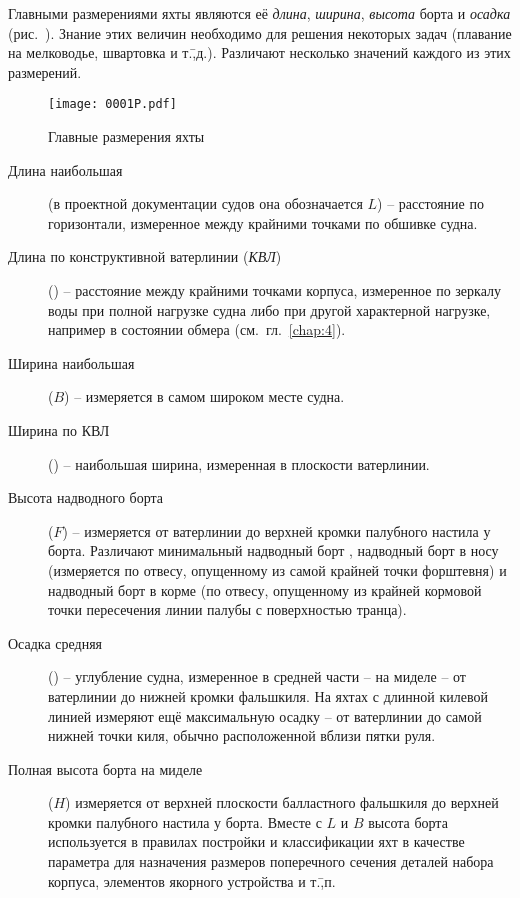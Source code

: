 Главными размерениями яхты являются её \textit{длина},
\textit{ширина},
\textit{высота} борта и
\textit{осадка} (рис.~). Знание этих
величин необходимо для решения некоторых задач (плавание на
мелководье, швартовка и т.\=,д.). Различают несколько значений каждого
из этих размерений.

\begin{figure*}[htb]
   \centering
   \texttt{[image: 0001P.pdf]}
   \caption{Главные размерения яхты}
   \label{fig:1}
\end{figure*}

\begin{description}
\item [Длина наибольшая] (в проектной
  документации судов она обозначается $L$) \--- расстояние по
  горизонтали, измеренное между крайними точками по обшивке судна.
\item [Длина по конструктивной ватерлинии
  (\textit{КВЛ})] (\lkvl) \--- расстояние
  между крайними точками корпуса, измеренное по зеркалу воды при
  полной нагрузке судна либо при другой характерной нагрузке, например
  в состоянии обмера (см.~гл.~\ref{chap:4}).
\item [Ширина наибольшая] ($B$) \---
  измеряется в самом широком месте судна.
\item [Ширина по КВЛ]
  (\bkvl) \--- наибольшая ширина, измеренная в плоскости ватерлинии.
\item [Высота надводного борта] ($F$)
  \--- измеряется от ватерлинии до верхней кромки палубного настила у
  борта. Различают минимальный надводный борт , надводный
  борт в носу  (измеряется по отвесу, опущенному из самой
  крайней точки форштевня) и надводный борт в корме  (по
  отвесу, опущенному из крайней кормовой точки пересечения линии
  палубы с поверхностью транца).
\item [Осадка средняя] (\tsr) \--- углубление
  судна, измеренное в средней части \--- на миделе \--- от ватерлинии
  до нижней кромки фальшкиля. На яхтах с длинной килевой линией
  измеряют ещё максимальную осадку \--- от ватерлинии до самой нижней
  точки киля, обычно расположенной вблизи пятки руля.
\item [Полная высота борта на миделе]
  ($H$) измеряется от верхней плоскости балластного
  фальшкиля до верхней кромки палубного настила у борта. Вместе с $L$
  и $B$ высота борта используется в правилах постройки и классификации
  яхт в качестве параметра для назначения размеров поперечного сечения
  деталей набора корпуса, элементов якорного устройства и т.\=,п.
\end{description}


